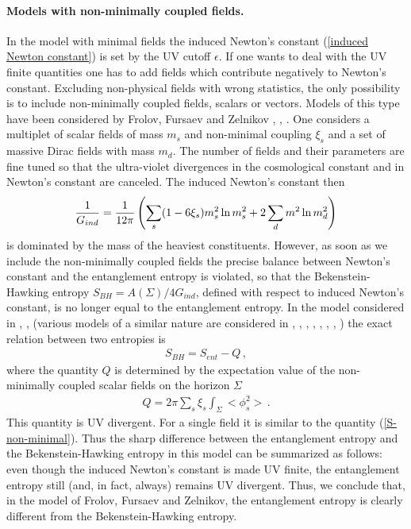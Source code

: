 \documentclass[12pt]{article}
\def\be{\begin{eqnarray}}
\def\ee{\end{eqnarray}}
\def\lb{\label}
\def\o{\over}
\begin{document}
\paragraph*{Models with non-minimally coupled fields.}  In the model with minimal fields the induced Newton's constant (\ref{induced Newton constant}) is set by the UV cutoff $\epsilon$. If one wants to deal with the UV finite quantities one has to add fields which contribute negatively to Newton's constant. Excluding  non-physical fields with wrong statistics, the only possibility is to include  non-minimally coupled fields, scalars or vectors.   Models of this type have been considered by Frolov, Fursaev and Zelnikov  \cite{Frolov:1996wd},  \cite{Frolov:1996aj},  \cite{Frolov:1997up}. One considers a multiplet of scalar fields of mass $m_s$ and non-minimal coupling $\xi_s$ and a set of massive Dirac fields with mass $m_d$.
The number of fields and their parameters are  fine tuned so that the ultra-violet divergences in the cosmological constant and in Newton's constant are canceled. The induced Newton's constant then
\be
{1\o G_{ind}}={1\o 12 \pi}\left(\sum_s (1-6\xi_s)m^2_s\ln m^2_s+2\sum_d m^2\ln m_d^2\right) 
\lb{induced newton constant in FFZ}
\ee
is dominated by  the mass of the heaviest constituents. 
However, as soon as we include the non-minimally coupled fields the precise  balance between Newton's constant and the entanglement entropy is violated,  so that
the Bekenstein-Hawking entropy $S_{BH}=A(\Sigma)/4G_{ind}$,  defined with respect to induced Newton's constant,  is no longer equal to the entanglement entropy. In the model considered in
\cite{Frolov:1996wd},  \cite{Frolov:1996aj},  \cite{Frolov:1997up}
 (various models of a similar nature are considered in  \cite{Frolov:1997xd}, \cite{Frolov:1996qh}, \cite{Frolov:1999my}, \cite{Frolov:1999hu},  \cite{Frolov:1999gy},    \cite{Frolov:1998ea}, \cite{Fursaev:1999jq}, \cite{Fursaev:1998hr}) the exact relation between two entropies is 
\be
S_{BH}=S_{ent}-Q\, ,
\lb{FFZ relation}
\ee
where the quantity $Q$ is determined by the expectation value of the non-minimally coupled scalar fields on the horizon $\Sigma$
\be
Q=2\pi \sum_s \xi_s\int_\Sigma <\phi_s^2>\, .
\lb{Q in FFZ}
\ee
This quantity is UV divergent. For a single field it is similar to the quantity (\ref{S-non-minimal}).
Thus the  sharp difference between the entanglement entropy and the Bekenstein-Hawking entropy in this model can be summarized as follows: even though the induced Newton's constant is made UV finite,  the entanglement entropy still (and, in fact, always)
remains UV divergent.   
Thus,  we conclude that, in the model of Frolov, Fursaev and Zelnikov, the entanglement entropy is clearly different from the Bekenstein-Hawking entropy.
\end{document}
